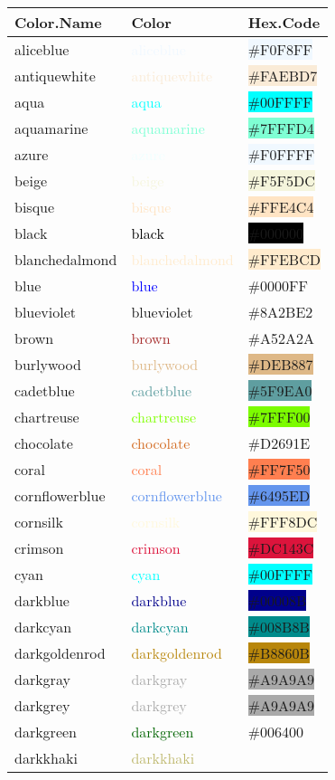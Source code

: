 \documentclass[
]{article}
\begin{document}
\begin{longtable}[]{@{}lll@{}}
\toprule
Color.Name & Color & Hex.Code\tabularnewline
\midrule
\endhead
aliceblue & \textcolor{aliceblue}{aliceblue} &
\colorbox{aliceblue}{\#F0F8FF}\tabularnewline
antiquewhite & \textcolor{antiquewhite}{antiquewhite} &
\colorbox{antiquewhite}{\#FAEBD7}\tabularnewline
aqua & \textcolor{aqua}{aqua} & \colorbox{aqua}{\#00FFFF}\tabularnewline
aquamarine & \textcolor{aquamarine}{aquamarine} &
\colorbox{aquamarine}{\#7FFFD4}\tabularnewline
azure & \textcolor{azure}{azure} &
\colorbox{aliceblue}{\#F0FFFF}\tabularnewline
beige & \textcolor{beige}{beige} &
\colorbox{beige}{\#F5F5DC}\tabularnewline
bisque & \textcolor{bisque}{bisque} &
\colorbox{bisque}{\#FFE4C4}\tabularnewline
black & \textcolor{black}{black} &
\colorbox{black}{\#000000}\tabularnewline
blanchedalmond & \textcolor{blanchedalmond}{blanchedalmond} &
\colorbox{blanchedalmond}{\#FFEBCD}\tabularnewline
blue & \textcolor{blue}{blue} & \colorbox{ao}{\#0000FF}\tabularnewline
blueviolet & \textcolor{blue-violet}{blueviolet} &
\colorbox{blue-violet}{\#8A2BE2}\tabularnewline
brown & \textcolor{brown}{brown} &
\colorbox{red-brown}{\#A52A2A}\tabularnewline
burlywood & \textcolor{burlywood}{burlywood} &
\colorbox{burlywood}{\#DEB887}\tabularnewline
cadetblue & \textcolor{cadetblue}{cadetblue} &
\colorbox{cadetblue}{\#5F9EA0}\tabularnewline
chartreuse & \textcolor{chartreuse}{chartreuse} &
\colorbox{lawngreen}{\#7FFF00}\tabularnewline
chocolate & \textcolor{chocolate}{chocolate} &
\colorbox{cinnamon}{\#D2691E}\tabularnewline
coral & \textcolor{coral}{coral} &
\colorbox{coral}{\#FF7F50}\tabularnewline
cornflowerblue & \textcolor{cornflowerblue}{cornflowerblue} &
\colorbox{cornflowerblue}{\#6495ED}\tabularnewline
cornsilk & \textcolor{cornsilk}{cornsilk} &
\colorbox{cornsilk}{\#FFF8DC}\tabularnewline
crimson & \textcolor{crimson}{crimson} &
\colorbox{crimson}{\#DC143C}\tabularnewline
cyan & \textcolor{cyan}{cyan} & \colorbox{aqua}{\#00FFFF}\tabularnewline
darkblue & \textcolor{darkblue}{darkblue} &
\colorbox{darkblue}{\#00008B}\tabularnewline
darkcyan & \textcolor{darkcyan}{darkcyan} &
\colorbox{darkcyan}{\#008B8B}\tabularnewline
darkgoldenrod & \textcolor{darkgoldenrod}{darkgoldenrod} &
\colorbox{darkgoldenrod}{\#B8860B}\tabularnewline
darkgray & \textcolor{darkgray}{darkgray} &
\colorbox{darkgray}{\#A9A9A9}\tabularnewline
darkgrey & \textcolor{darkgray}{darkgrey} &
\colorbox{darkgray}{\#A9A9A9}\tabularnewline
darkgreen & \textcolor{darkgreen}{darkgreen} &
\colorbox{pakistangreen}{\#006400}\tabularnewline
darkkhaki & \textcolor{darkkhaki}{darkkhaki} &

\end{longtable}
\end{document}
